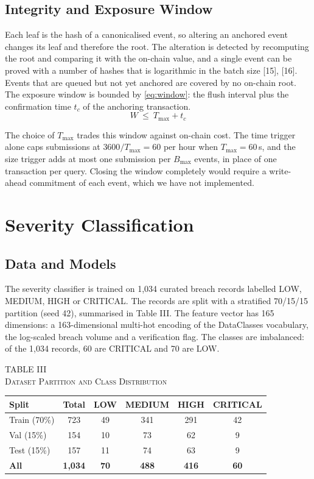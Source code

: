 \documentclass[10pt,twocolumn]{article}
\newcommand{\tcap}[2]{\begin{center}\footnotesize TABLE #1\\[1pt]\scshape #2\end{center}\vspace{-8pt}}
\begin{document}
\subsection{Integrity and Exposure Window}

Each leaf is the hash of a canonicalised event, so altering an anchored event changes its leaf and therefore the root. The alteration is detected by recomputing the root and comparing it with the on-chain value, and a single event can be proved with a number of hashes that is logarithmic in the batch size [15], [16]. Events that are queued but not yet anchored are covered by no on-chain root. The exposure window is bounded by \eqref{eq:window}: the flush interval plus the confirmation time $t_c$ of the anchoring transaction.
\begin{equation}
W\ \le\ T_{\max}+t_c
\label{eq:window}
\end{equation}

The choice of $T_{\max}$ trades this window against on-chain cost. The time trigger alone caps submissions at $3600/T_{\max}=60$ per hour when $T_{\max}=60$\,s, and the size trigger adds at most one submission per $B_{\max}$ events, in place of one transaction per query. Closing the window completely would require a write-ahead commitment of each event, which we have not implemented.

\section{Severity Classification}

\subsection{Data and Models}

The severity classifier is trained on 1,034 curated breach records labelled LOW, MEDIUM, HIGH or CRITICAL. The records are split with a stratified 70/15/15 partition (seed 42), summarised in Table III. The feature vector has 165 dimensions: a 163-dimensional multi-hot encoding of the DataClasses vocabulary, the log-scaled breach volume and a verification flag. The classes are imbalanced: of the 1,034 records, 60 are CRITICAL and 70 are LOW.

\begin{table}[!t]
\centering
\tcap{III}{Dataset Partition and Class Distribution}
\footnotesize
\setlength{\tabcolsep}{4pt}
\begin{tabular}{|l|c|c|c|c|c|}
\hline
\textbf{Split} & \textbf{Total} & \textbf{LOW} & \textbf{MEDIUM} & \textbf{HIGH} & \textbf{CRITICAL}\\
\hline
Train (70\%) & 723 & 49 & 341 & 291 & 42\\
\hline
Val (15\%) & 154 & 10 & 73 & 62 & 9\\
\hline
Test (15\%) & 157 & 11 & 74 & 63 & 9\\
\hline
\textbf{All} & \textbf{1,034} & \textbf{70} & \textbf{488} & \textbf{416} & \textbf{60}\\
\hline
\end{tabular}
\end{table}
\end{document}
